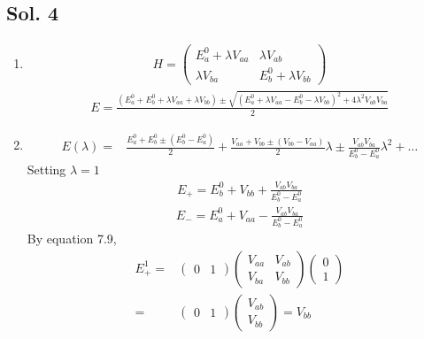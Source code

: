 \subsection*{Sol. 4}
\begin{enumerate}
    \item 
    \begin{align*}
        H = \begin{pmatrix}
        E_a^0+\lambda V_{aa} & \lambda V_{ab}\\
        \lambda V_{ba} & E_b^0+\lambda V_{bb}
        \end{pmatrix}
    \end{align*}
    \begin{align*}
        E = \frac{(E_a^0+E_b^0+\lambda V_{aa}+\lambda V_{bb})
        \pm \sqrt{(E^0_a+\lambda V_{aa}-E^0_b-\lambda V_{bb})^2+4\lambda^2V_{ab}V_{ba}}
        }{2}
    \end{align*}
    \item 
    \begin{align*}
        E(\lambda) = &
        \frac{E_a^0+E_b^0\pm(E_b^0-E_a^0)}{2}
        +\frac{V_{aa}+V_{bb}\pm(V_{bb}-V_{aa})}{2}\lambda \pm\frac{V_{ab}V_{ba}}{E_b^0-E_a^0}
        \lambda^2 +\dots
    \end{align*}
    Setting $\lambda=1$
    \begin{align*}
        E_+=E_b^0+V_{bb}+\frac{V_{ab}V_{ba}}{E_b^0-E_a^0}
    \end{align*}
     \begin{align*}
        E_-=E_a^0+V_{aa}-\frac{V_{ab}V_{ba}}{E_b^0-E_a^0}
    \end{align*}
    By equation 7.9,
    \begin{align*}
         E^1_+ =& \begin{pmatrix}
        0 & 1
    \end{pmatrix}
    \begin{pmatrix}
        V_{aa} & V_{ab}\\
        V_{ba} & V_{bb}
    \end{pmatrix}
    \begin{pmatrix}
        0 \\ 1
    \end{pmatrix}\\
    =&\begin{pmatrix}
        0 & 1
    \end{pmatrix}
    \begin{pmatrix}
        V_{ab}\\V_{bb}
    \end{pmatrix} = V_{bb}

\end{align*}
\end{enumerate}
